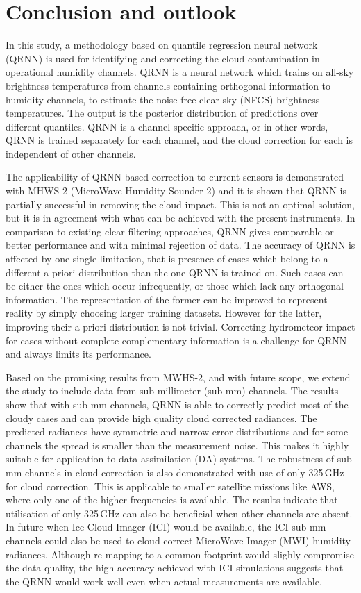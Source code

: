 \documentclass[amt, manuscript]{copernicus}
\begin{document}
\section{Conclusion and outlook}  %
\label{conclusions}
%

In this study, a methodology based on quantile regression neural network (QRNN) is used for identifying and correcting the cloud contamination in operational humidity channels. QRNN is a neural network which trains on all-sky brightness temperatures from  channels containing orthogonal information to humidity channels, to estimate the noise free clear-sky (NFCS) brightness temperatures. The output is the posterior distribution of predictions over different quantiles. QRNN is a channel specific approach, or in other words, QRNN is trained separately for each channel, and the cloud correction for each is independent of other channels. 
 
The applicability of QRNN based correction to current sensors is demonstrated with MHWS-2 (MicroWave Humidity Sounder-2) and it is shown that QRNN is partially successful in removing the cloud impact. This is not  an optimal solution, but it is in agreement with what can be achieved with the present instruments. In comparison to existing clear-filtering approaches, QRNN gives comparable or better performance and with minimal rejection of data. The accuracy of QRNN is affected by one single limitation, that is presence of cases which belong to a different a priori distribution than the one QRNN is trained on. Such cases can be either the ones which occur infrequently, or those which lack any orthogonal information. The representation of the former can be improved to represent reality by simply choosing larger training datasets. However for the latter, improving their a priori distribution is not trivial. Correcting hydrometeor impact for cases without complete complementary information is a challenge for QRNN and always limits its performance.

Based on the promising results from MWHS-2, and with future scope, we extend the study to include data from sub-millimeter (sub-mm) channels. The results show that with  sub-mm channels, QRNN is able to correctly predict most of the cloudy cases and can provide high quality cloud corrected radiances. The predicted radiances have symmetric and narrow error distributions and for some channels the spread is smaller than the measurement noise. This makes it highly suitable for application to data assimilation (DA) systems. The robustness of sub-mm channels in cloud correction is also demonstrated with use of only 325\,GHz for cloud correction. This is applicable to smaller satellite missions like AWS, where only one of the higher frequencies is available. The results indicate that utilisation of only 325\,GHz can also be beneficial when other channels are absent. In future when Ice Cloud Imager (ICI) would be available, the ICI sub-mm channels could also be used to cloud correct MicroWave Imager (MWI) humidity radiances. Although re-mapping to a common footprint would slighly compromise the data quality, the high accuracy achieved with ICI simulations suggests that the QRNN would work well even when actual measurements are available.
\end{document}
